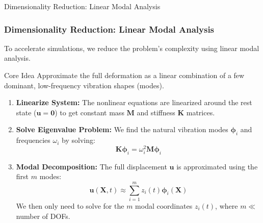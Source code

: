 \documentclass{beamer}
\begin{document}
\begin{frame}{Dimensionality Reduction: Linear Modal Analysis}
    \frametitle{Dimensionality Reduction: Linear Modal Analysis}
    
    To accelerate simulations, we reduce the problem's complexity using linear modal analysis.
    \begin{block}{Core Idea}
        Approximate the full deformation as a linear combination of a few dominant, low-frequency vibration shapes (modes).
    \end{block}
    
    \begin{enumerate}
        \item \textbf{Linearize System:} The nonlinear equations are linearized around the rest state (\(\bm{u}=\bm{0}\)) to get constant mass \(\bm{M}\) and stiffness \(\bm{K}\) matrices.
        \vspace{0.5em}
        
        \item \textbf{Solve Eigenvalue Problem:} We find the natural vibration modes \(\bm{\phi}_i\) and frequencies \(\omega_i\) by solving:
            \begin{equation*}
                \bm{K} \bm{\phi}_i = \omega_i^2 \bm{M} \bm{\phi}_i
            \end{equation*}
        \vspace{0.5em}
            
        \item \textbf{Modal Decomposition:} The full displacement \(\bm{u}\) is approximated using the first \(m\) modes:
            \begin{equation*}
                \bm{u}(\bm{X},t) \approx \sum_{i=1}^{m} z_i(t) \bm{\phi}_i(\bm{X})
            \end{equation*}
            We then only need to solve for the \(m\) modal coordinates \(z_i(t)\), where \(m \ll\) number of DOFs.
    \end{enumerate}
\end{frame}
\end{document}
